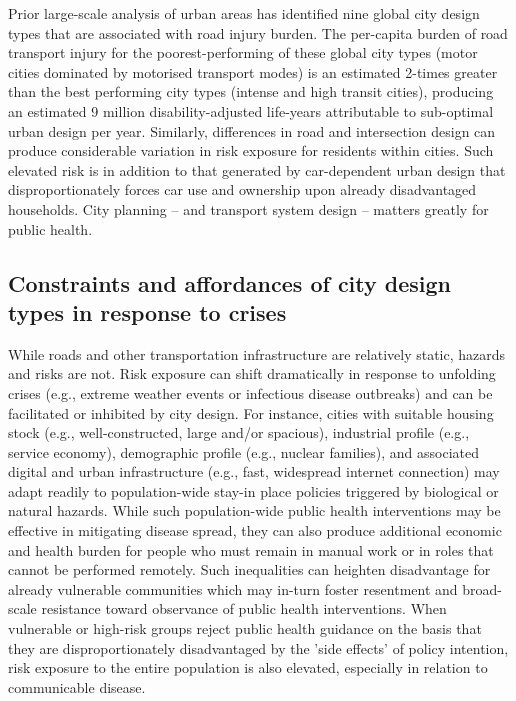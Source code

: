 \documentclass[preprint,10pt]{elsarticle} %
\begin{document}
Prior large-scale analysis of urban areas has identified nine global city design types that are associated with road injury burden\cite{Thompson2020}. The per-capita burden of road transport injury for the poorest-performing of these global city types (motor cities dominated by motorised transport modes) is an estimated 2-times greater than the best performing city types (intense and high transit cities), producing an estimated 9 million disability-adjusted life-years attributable to sub-optimal urban design per year\cite{Thompson2020}. Similarly, differences in road and intersection design can produce considerable variation in risk exposure for residents within cities\cite{Wijnands_IntersectionDesign2021,MORRISON2019123}. Such elevated risk is in addition to that generated by car-dependent urban design that disproportionately forces car use and ownership upon already disadvantaged households\cite{currie2018alarming, CURL201861}. City planning -- and transport system design -- matters greatly for public health.

\subsection*{Constraints and affordances of city design types in response to crises}
While roads and other transportation infrastructure are relatively static, hazards and risks are not. Risk exposure can shift dramatically in response to unfolding crises (e.g., extreme weather events or infectious disease outbreaks) and can be facilitated or inhibited by city design. For instance, cities with suitable housing stock (e.g., well-constructed, large and/or spacious), industrial profile (e.g., service economy), demographic profile (e.g., nuclear families), and associated digital and urban infrastructure (e.g., fast, widespread internet connection) may adapt readily to population-wide stay-in place policies triggered by biological or natural hazards\cite{hale2021global}. While such population-wide public health interventions may be effective in mitigating disease spread, they can also produce additional economic and health burden for people who must remain in manual work or in roles that cannot be performed remotely\cite{CraigWFH,Vyas2021}. Such inequalities can heighten disadvantage for already vulnerable communities\cite{martin2020fighting} which may in-turn foster resentment and broad-scale resistance toward observance of public health interventions\cite{de2016sustainability}. When vulnerable or high-risk groups reject public health guidance on the basis that they are disproportionately disadvantaged by the 'side effects' of policy intention, risk exposure to the entire population is also elevated, especially in relation to communicable disease\cite{koopman2005control}.
\end{document}

